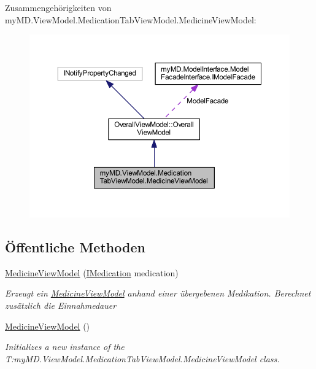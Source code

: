 Zusammengehörigkeiten von my\+M\+D.\+View\+Model.\+Medication\+Tab\+View\+Model.\+Medicine\+View\+Model\+:
\nopagebreak
\begin{figure}[H]
\begin{center}
\leavevmode
\includegraphics[width=350pt]{classmy_m_d_1_1_view_model_1_1_medication_tab_view_model_1_1_medicine_view_model__coll__graph}
\end{center}
\end{figure}
\subsection*{Öffentliche Methoden}
\begin{DoxyCompactItemize}
\item 
\mbox{\hyperlink{classmy_m_d_1_1_view_model_1_1_medication_tab_view_model_1_1_medicine_view_model_ae443badf863a9a10f8db6065c7c2268f}{Medicine\+View\+Model}} (\mbox{\hyperlink{interfacemy_m_d_1_1_model_interface_1_1_data_model_interface_1_1_i_medication}{I\+Medication}} medication)
\begin{DoxyCompactList}\small\item\em Erzeugt ein \mbox{\hyperlink{classmy_m_d_1_1_view_model_1_1_medication_tab_view_model_1_1_medicine_view_model}{Medicine\+View\+Model}} anhand einer übergebenen Medikation. Berechnet zusätzlich die Einnahmedauer \end{DoxyCompactList}\item 
\mbox{\hyperlink{classmy_m_d_1_1_view_model_1_1_medication_tab_view_model_1_1_medicine_view_model_a31722e22ef4ffb25f9fc2f9629408ed4}{Medicine\+View\+Model}} ()
\begin{DoxyCompactList}\small\item\em Initializes a new instance of the T\+:my\+M\+D.\+View\+Model.\+Medication\+Tab\+View\+Model.\+Medicine\+View\+Model class. \end{DoxyCompactList}\end{DoxyCompactItemize}
